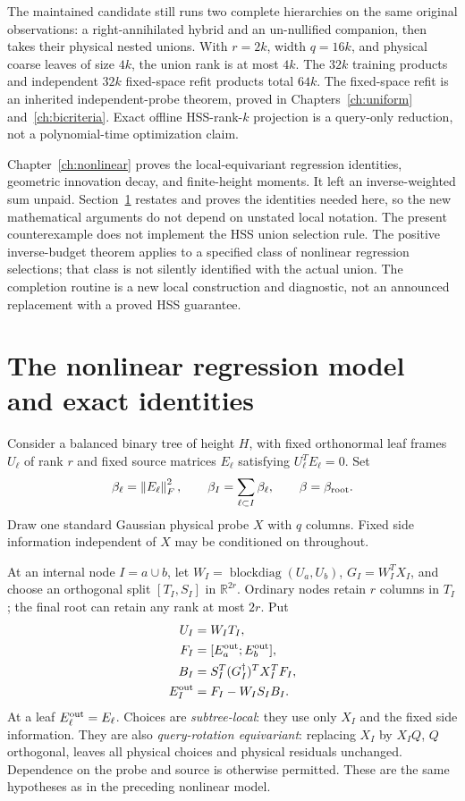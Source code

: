 \documentclass[11pt,oneside,openany,a4paper]{book}
\numberwithin{equation}{chapter}
\theoremstyle{definition}
\theoremstyle{remark}
\newcommand{\R}{\mathbb R}\newcommand{\E}{\mathbb E}\newcommand{\Prb}{\mathbb P}\newcommand{\PP}{\mathbb P}
\newcommand{\F}[1]{\left\lVert#1\right\rVert_F}
\DeclareMathOperator{\diag}{blockdiag}\DeclareMathOperator{\range}{range}
\begin{document}
The maintained candidate still runs two complete hierarchies on the same original observations: a right-annihilated hybrid and an un-nullified companion, then takes their physical nested unions. With $r=2k$, width $q=16k$, and physical coarse leaves of size $4k$, the union rank is at most $4k$. The $32k$ training products and independent $32k$ fixed-space refit products total $64k$. The fixed-space refit is an inherited independent-probe theorem, proved in Chapters~\ref{ch:uniform} and~\ref{ch:bicriteria}. Exact offline HSS-rank-$k$ projection is a query-only reduction, not a polynomial-time optimization claim.

Chapter~\ref{ch:nonlinear} proves the local-equivariant regression identities, geometric innovation decay, and finite-height moments. It left an inverse-weighted sum unpaid. Section~\ref{budget:sec:model} restates and proves the identities needed here, so the new mathematical arguments do not depend on unstated local notation. The present counterexample does not implement the HSS union selection rule. The positive inverse-budget theorem applies to a specified class of nonlinear regression selections; that class is not silently identified with the actual union. The completion routine is a new local construction and diagnostic, not an announced replacement with a proved HSS guarantee.

\section{The nonlinear regression model and exact identities}\label{budget:sec:model}
Consider a balanced binary tree of height $H$, with fixed orthonormal leaf frames $U_\ell$ of rank $r$ and fixed source matrices $E_\ell$ satisfying $U_\ell^TE_\ell=0$. Set
\[
 \beta_\ell=\F{E_\ell}^2,\qquad
 \beta_I=\sum_{\ell\subset I}\beta_\ell,\qquad \beta=\beta_{\rm root}.
\]
Draw one standard Gaussian physical probe $X$ with $q$ columns. Fixed side information independent of $X$ may be conditioned on throughout.

At an internal node $I=a\cup b$, let $W_I=\diag(U_a,U_b)$, $G_I=W_I^TX_I$, and choose an orthogonal split $[T_I,S_I]$ in $\R^{2r}$. Ordinary nodes retain $r$ columns in $T_I$; the final root can retain any rank at most $2r$. Put
\begin{equation}\label{budget:eq:physical}
 \begin{split}
 U_I&=W_IT_I,\\
 F_I&=[E_a^{\rm out};E_b^{\rm out}],\\
 B_I&=S_I^T(G_I^\dagger)^TX_I^TF_I,\\
 E_I^{\rm out}&=F_I-W_IS_IB_I.
 \end{split}
\end{equation}
At a leaf $E_\ell^{\rm out}=E_\ell$. Choices are \emph{subtree-local}: they use only $X_I$ and the fixed side information. They are also \emph{query-rotation equivariant}: replacing $X_I$ by $X_IQ$, $Q$ orthogonal, leaves all physical choices and physical residuals unchanged. Dependence on the probe and source is otherwise permitted. These are the same hypotheses as in the preceding nonlinear model.
\end{document}
